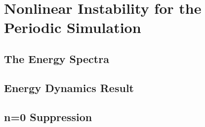 \chapter{Nonlinear Instability for the Periodic Simulation}
\label{c_nlin_periodic}

\section{The Energy Spectra}
\label{s_en_spec}

\section{Energy Dynamics Result}
\label{s_per_en_dyn}

\section{n=0 Suppression}
\label{s_n0_supp}
